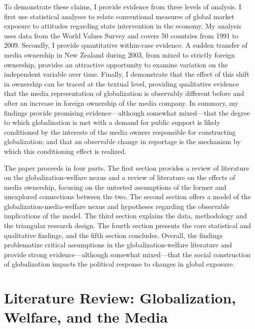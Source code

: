 \documentclass[12pt]{report}
\begin{document}
	To demonstrate these claims, I provide evidence from three levels of analysis. I first use statistical analyses to relate conventional measures of global market exposure to attitudes regarding state intervention in the economy. My analysis uses data from the World Values Survey and covers 50 countries from 1991 to 2009. Secondly, I provide quantitative within-case evidence. A sudden transfer of media ownership in New Zealand during 2003, from mixed to strictly foreign ownership, provides an attractive opportunity to examine variation on the independent variable over time. Finally, I demonstrate that the effect of this shift in ownership can be traced at the textual level, providing qualitative evidence that the media representation of globalization is observably different before and after an increase in foreign ownership of the media company. In summary, my findings provide promising evidence---although somewhat mixed---that the degree to which globalization is met with a demand for public support is likely conditioned by the interests of the media owners responsible for constructing globalization; and that an observable change in reportage is the mechanism by which this conditioning effect is realized.

The paper proceeds in four parts. The first section provides a review of literature on the globalization-welfare nexus and a review of literature on the effects of media ownership, focusing on the untested assumptions of the former and unexplored connections between the two. The second section offers a model of the globalization-media-welfare nexus and hypotheses regarding the observable implications of the model. The third section explains the data, methodology and the triangular research design. The fourth section presents the core statistical and qualitative findings, and the fifth section concludes. Overall, the findings problematize critical assumptions in the globalization-welfare literature and provide strong evidence---although somewhat mixed---that the social construction of globalization impacts the political response to changes in global exposure.

\section{Literature Review: Globalization, Welfare, and the Media}
\end{document}
